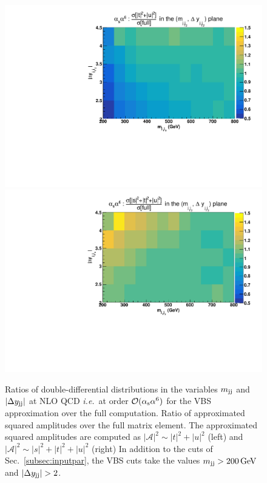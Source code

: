 \begin{figure}[hbt]
\centering
{\includegraphics[scale=0.395]{figures/scanfigures/a6as_vbfnloVSrecola_tu.pdf}}
{\includegraphics[scale=0.395]{figures/scanfigures/a6as_vbfnloVSrecola_stu.pdf}}
\caption{Ratios of double-differential distributions in the variables $m_{\text{j}\text{j}}$ and $|\Delta y_{\text{j}\text{j}}|$ at NLO QCD \emph{i.e.}\ at order $\mathcal{O}(\alpha_\text{s}\alpha^6)$ for the VBS approximation over the full computation.
Ratio of approximated squared amplitudes over the full matrix element.
The approximated squared amplitudes are computed as $|\mathcal{A}|^2 \sim |t|^2+|u|^2$ (left) and $|\mathcal{A}|^2 \sim |s|^2+|t|^2+|u|^2$ (right)
In addition to the cuts of Sec.~\ref{subsec:inputpar}, the VBS cuts take the values $m_{\text{j}\text{j}}>200 \,\text{GeV}$ and $|\Delta y_{\Pj\Pj}|>2$.}
\label{fig:ratio2d_NLO}
\end{figure}
%

